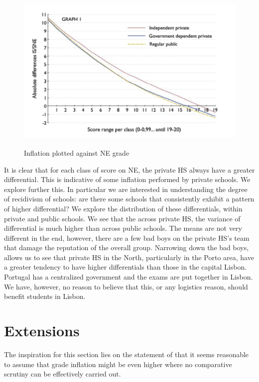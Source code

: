 \documentclass{article}
\begin{document}
\begin{figure}[ht]
  \centering
  \includegraphics[height=8cm, keepaspectratio]{Figures/Inflation_Nata.png}
  \caption{Inflation plotted against NE grade}
  \label{fig: Inflation_Nata}
\end{figure}

It is clear that for each class of score on NE, the private HS always have a greater differential. This is indicative of some inflation performed by private schools. We explore further this. 
In particular we are interested in understanding the degree of recidivism of schools: are there some schools that consistently exhibit a pattern of higher differential?
We explore the distribution of these differentials, within private and public schools. We see that the across private HS, the variance of differential is much higher than across public schools. The means are not very different in the end, however, there are a few bad boys on the private HS's team that damage the reputation of the overall group.
Narrowing down the bad boys, allows us to see that private HS in the North, particularly in the Porto area, have a greater tendency to have higher differentials than those in the capital Lisbon. Portugal has a centralized government and the exams are put together in Lisbon. We have, however, no reason to believe that this, or any logistics reason, should benefit students in Lisbon.






\section{Extensions}

The inspiration for this section lies on the statement of \cite{nata2014unfairness} that it seems reasonable to assume that grade inflation might be even higher where no comparative scrutiny can be effectively carried out.
\end{document}
